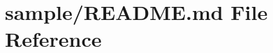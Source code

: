 \hypertarget{sample_2README_8md}{}\section{sample/\+R\+E\+A\+D\+ME.md File Reference}
\label{sample_2README_8md}
